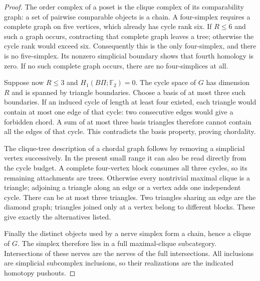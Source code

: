 \begin{proof}
The order complex of a poset is the clique complex of its
comparability graph: a set of pairwise comparable objects
is a chain.  A four-simplex requires a complete graph on
five vertices, which already has cycle rank six.  If
$R\leq6$ and such a graph occurs, contracting that complete
graph leaves a tree; otherwise the cycle rank would exceed
six.  Consequently this is the only four-simplex, and
there is no five-simplex.  Its nonzero simplicial boundary
shows that fourth homology is zero.  If no such complete
graph occurs, there are no four-simplices at all.

Suppose now $R\leq3$ and $H_1(B\Pi;\mathbb F_2)=0$.
The cycle space of $G$ has dimension $R$ and is spanned
by triangle boundaries.  Choose a basis of at most three
such boundaries.  If an induced cycle of length at least
four existed, each triangle would contain at most one
edge of that cycle: two consecutive edges would give a
forbidden chord.  A sum of at most three basis triangles
therefore cannot contain all the edges of that cycle.
This contradicts the basis property, proving chordality.

The clique-tree description of a chordal graph follows
by removing a simplicial vertex successively.  In the
present small range it can also be read directly from
the cycle budget.  A complete four-vertex block consumes
all three cycles, so its remaining attachments are trees.
Otherwise every nontrivial maximal clique is a triangle;
adjoining a triangle along an edge or a vertex adds one
independent cycle.  There can be at most three triangles.
Two triangles sharing an edge are the diamond graph;
triangles joined only at a vertex belong to different
blocks.  These give exactly the alternatives listed.

Finally the distinct objects used by a nerve simplex
form a chain, hence a clique of $G$.  The simplex therefore
lies in a full maximal-clique subcategory.  Intersections
of these nerves are the nerves of the full intersections.
All inclusions are simplicial subcomplex inclusions, so
their realizations are the indicated homotopy pushouts.
\end{proof}

